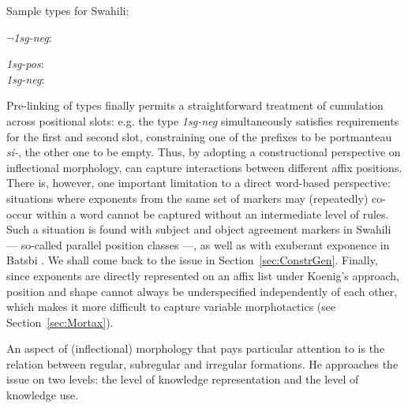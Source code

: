 \documentclass[output=paper
	        ,collection
	        ,collectionchapter
 	        ,biblatex
                ,babelshorthands
                ,newtxmath
                ,draftmode
                ,colorlinks, citecolor=brown
]{langscibook}
\begin{document}
\begin{exe}
\ex\label{ex-KoenigNegPast}
Sample types for Swahili:
\begin{xlist}
\ex \textit{$\neg$1sg-neg}:\\

\ex \textit{1sg-pos}:\\
\ex \textit{1sg-neg}:\\
\zl

Pre-linking of types finally permits a straightforward treatment of
cumulation across positional slots: e.g. the type \textit{1sg-neg}
simultaneously satisfies requirements for the first and second slot,
constraining one of the prefixes to be portmanteau \textit{si-}, the
other one to be empty. Thus, by adopting a constructional perspective
on inflectional morphology, \citet{Koenig99} can capture interactions
between different affix positions. There is, however, one important
limitation to a direct word-based perspective: situations where
exponents from the same set of markers may (repeatedly) co-occur
within a word cannot be captured without an intermediate level of
rules. Such a situation is found with subject and object agreement
markers in Swahili --- so-called parallel position classes
\citep{Stump93,Crysmann:Bonami:2016} ---, as well as with exuberant
exponence in Batsbi \citep{Harris09,Crysmann:2018:Batsbi}. We shall
come back to the issue in Section~\ref{sec:ConstrGen}. Finally, since
exponents are directly represented on an affix list under Koenig's
approach, position and shape cannot always be underspecified
independently of each other, which makes it more difficult to
capture variable morphotactics (see Section~\ref{sec:Mortax}).


An aspect of (inflectional) morphology that \citet{Koenig99} pays
particular attention to is the relation between regular, subregular
and irregular formations. He approaches the issue on two levels: the
level of knowledge representation and the level of knowledge use. 


\end{xlist}
\end{exe}
\end{document}
